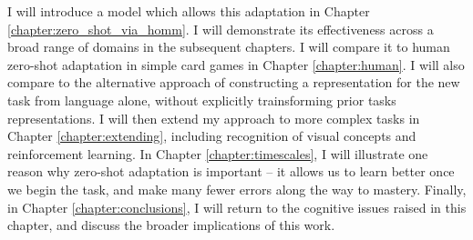  I will introduce a model which allows this adaptation in Chapter \ref{chapter:zero_shot_via_homm}. I will demonstrate its effectiveness across a broad range of domains in the subsequent chapters. I will compare it to human zero-shot adaptation in simple card games in Chapter \ref{chapter:human}. I will also compare to the alternative approach of constructing a representation for the new task from language alone, without explicitly trainsforming prior tasks representations. I will then extend my approach to more complex tasks in Chapter \ref{chapter:extending}, including recognition of visual concepts and reinforcement learning. In Chapter \ref{chapter:timescales}, I will illustrate one reason why zero-shot adaptation is important -- it allows us to learn better once we begin the task, and make many fewer errors along the way to mastery. Finally, in Chapter \ref{chapter:conclusions}, I will return to the cognitive issues raised in this chapter, and discuss the broader implications of this work.\par 

